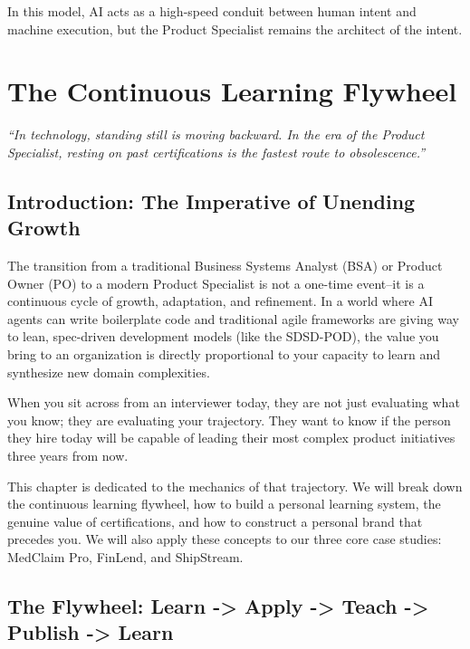 \documentclass[
  11pt,
  openany,
  oneside]{book}
\renewenvironment{quote}{\begin{customquote}}{\end{customquote}}
\begin{document}
In this model, AI acts as a high-speed conduit between human intent and
machine execution, but the Product Specialist remains the architect of
the intent.

\chapter{The Continuous Learning
Flywheel}\label{the-continuous-learning-flywheel-1}

\begin{quote}
\emph{``In technology, standing still is moving backward. In the era of
the Product Specialist, resting on past certifications is the fastest
route to obsolescence.''}
\end{quote}

\section{Introduction: The Imperative of Unending
Growth}\label{introduction-the-imperative-of-unending-growth}

The transition from a traditional Business Systems Analyst (BSA) or
Product Owner (PO) to a modern Product Specialist is not a one-time
event--it is a continuous cycle of growth, adaptation, and refinement.
In a world where AI agents can write boilerplate code and traditional
agile frameworks are giving way to lean, spec-driven development models
(like the SDSD-POD), the value you bring to an organization is directly
proportional to your capacity to learn and synthesize new domain
complexities.

When you sit across from an interviewer today, they are not just
evaluating what you know; they are evaluating your trajectory. They want
to know if the person they hire today will be capable of leading their
most complex product initiatives three years from now.

This chapter is dedicated to the mechanics of that trajectory. We will
break down the continuous learning flywheel, how to build a personal
learning system, the genuine value of certifications, and how to
construct a personal brand that precedes you. We will also apply these
concepts to our three core case studies: MedClaim Pro, FinLend, and
ShipStream.

\bigskip

\section{The Flywheel: Learn -\textgreater{} Apply -\textgreater{} Teach
-\textgreater{} Publish -\textgreater{}
Learn}\label{the-flywheel-learn---apply---teach---publish---learn}
\end{document}
